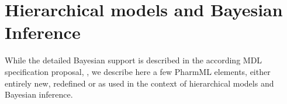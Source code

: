 %
%
%

\chapter{Hierarchical models and Bayesian Inference}
\label{ch:Bayesian}

While the detailed Bayesian support is described in the according MDL 
specification proposal, \cite{Chiudinelli2015}, we describe here a few PharmML 
elements, either entirely new, redefined or as used in the context of 
hierarchical models and Bayesian inference.

